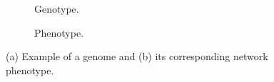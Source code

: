 \begin{figure}[H]
    \begin{mdframed}
        \begin{subfigure}[b]{0.45\textwidth}
            \centering
            \resizebox{1\textwidth}{!}{}
            \caption{Genotype.}
            \label{genotype}
        \end{subfigure}
        \begin{subfigure}[b]{0.45\textwidth}
            \centering
            \resizebox{0.65\textwidth}{!}{}
            \caption{Phenotype.}
            \label{phenotype}
        \end{subfigure}
    \end{mdframed}
    \caption{ (a) Example of a genome and (b) its corresponding network phenotype.}
    \label{mapping}
\end{figure}
